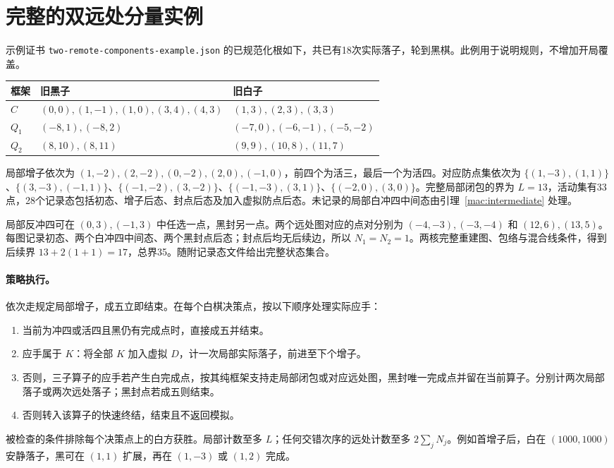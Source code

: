 \documentclass[11pt]{article}
\theoremstyle{definition}
\theoremstyle{remark}
\newcommand{\code}[1]{\texttt{#1}}
\begin{document}
\section{完整的双远处分量实例}\label{app:remote-example}
示例证书 \code{two-remote-components-example.json} 的已规范化根如下，共已有18次实际落子，轮到黑棋。此例用于说明规则，不增加开局覆盖。
\begin{center}\small
\begin{tabular}{@{}lll@{}}\toprule
框架 & 旧黑子 & 旧白子\\\midrule
$C$ & $(0,0),(1,-1),(1,0),(3,4),(4,3)$ & $(1,3),(2,3),(3,3)$\\
$Q_1$ & $(-8,1),(-8,2)$ & $(-7,0),(-6,-1),(-5,-2)$\\
$Q_2$ & $(8,10),(8,11)$ & $(9,9),(10,8),(11,7)$\\\bottomrule
\end{tabular}\end{center}
局部增子依次为 $(1,-2),(2,-2),(0,-2),(2,0),(-1,0)$，前四个为活三，最后一个为活四。对应防点集依次为 $\{(1,-3),(1,1)\}$、$\{(3,-3),(-1,1)\}$、$\{(-1,-2),(3,-2)\}$、$\{(-1,-3),(3,1)\}$、$\{(-2,0),(3,0)\}$。完整局部闭包的界为 $L=13$，活动集有33点，28个记录态包括初态、增子后态、封点后态及加入虚拟防点后态。未记录的局部白冲四中间态由引理~\ref{mac:intermediate} 处理。

局部反冲四可在 $(0,3),(-1,3)$ 中任选一点，黑封另一点。两个远处图对应的点对分别为 $(-4,-3),(-3,-4)$ 和 $(12,6),(13,5)$。每图记录初态、两个白冲四中间态、两个黑封点后态；封点后均无后续边，所以 $N_1=N_2=1$。两核完整重建图、包络与混合线条件，得到后续界 $13+2(1+1)=17$，总界35。随附记录态文件给出完整状态集合。

\paragraph{策略执行。}
依次走规定局部增子，成五立即结束。在每个白棋决策点，按以下顺序处理实际应手：
\begin{enumerate}\setlength{\itemsep}{0pt}\setlength{\parsep}{0pt}
\item 当前为冲四或活四且黑仍有完成点时，直接成五并结束。
\item 应手属于 $K$：将全部 $K$ 加入虚拟 $D$，计一次局部实际落子，前进至下个增子。
\item 否则，三子算子的应手若产生白完成点，按其纯框架支持走局部闭包或对应远处图，黑封唯一完成点并留在当前算子。分别计两次局部落子或两次远处落子；黑封点若成五则结束。
\item 否则转入该算子的快速终结，结束且不返回模拟。
\end{enumerate}
被检查的条件排除每个决策点上的白方获胜。局部计数至多 $L$；任何交错次序的远处计数至多 $2\sum_jN_j$。例如首增子后，白在 $(1000,1000)$ 安静落子，黑可在 $(1,1)$ 扩展，再在 $(1,-3)$ 或 $(1,2)$ 完成。
\end{document}
